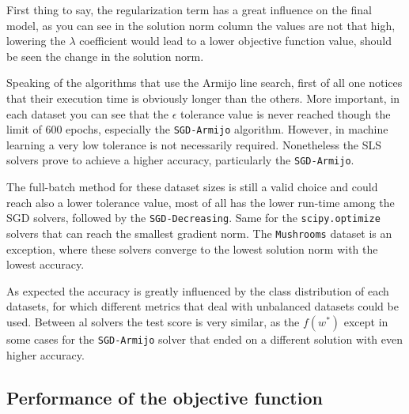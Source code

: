 


First thing to say, the regularization term has a great influence on the final model, as you can see in the solution norm column the values are not that high, %
lowering the $\lambda$ coefficient would lead to a lower objective function value, should be seen the change in the solution norm.

Speaking of the algorithms that use the Armijo line search, first of all one notices that their execution time is obviously longer than the others. More important, in each dataset you can see that the $\epsilon$ tolerance value is never reached though the limit of 600 epochs, especially the \texttt{SGD-Armijo} algorithm. However, in machine learning a very low tolerance is not necessarily required. Nonetheless the SLS solvers prove to achieve a higher accuracy, particularly the \texttt{SGD-Armijo}.

The full-batch method for these dataset sizes is still a valid choice and could reach also a lower tolerance value, most of all has the lower run-time among the SGD solvers, followed by the \texttt{SGD-Decreasing}. Same for the \texttt{scipy.optimize} solvers that can reach the smallest gradient norm. The \texttt{Mushrooms} dataset is an exception, where these solvers converge to the lowest solution norm with the lowest accuracy.

As expected the accuracy is greatly influenced by the class distribution of each datasets, for which different metrics that deal with unbalanced datasets could be used. Between al solvers the test score is very similar, as the $f(w^\ast)$ except in some cases for the \texttt{SGD-Armijo} solver that ended on a different solution with even higher accuracy.

\subsection{Performance of the objective function}

